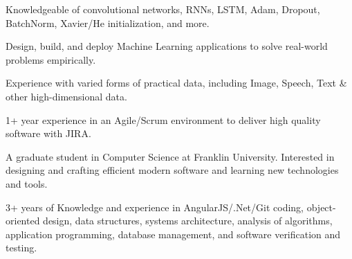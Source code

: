 \begin{cventries}
  \cventry
    {}
    {}
    {}
    {}
    {
      \vspace{-7mm}\begin{cvitems}
 \item {Knowledgeable of convolutional networks, RNNs, LSTM, Adam, Dropout, BatchNorm, Xavier/He initialization, and more.}
 \item {Design, build, and deploy Machine Learning applications to solve real-world problems empirically.}
  \item {Experience with varied forms of practical data, including Image, Speech, Text \& other
high-dimensional data.}
  \item {1+ year experience in an Agile/Scrum environment to deliver high quality software with JIRA.}
 \item {A graduate student in Computer Science at Franklin University. Interested in designing and crafting efficient modern software
and learning new technologies and tools.}
        \item {3+ years of Knowledge and experience in AngularJS/.Net/Git coding, object-oriented design, data structures, systems architecture, analysis of algorithms, application programming, database management, and software verification and testing.}     
      \end{cvitems}
    }
\end{cventries}
